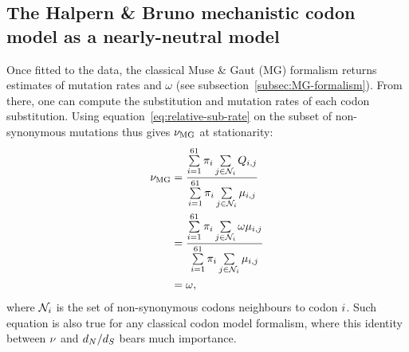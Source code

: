 \begin{table}[htbp]
    \centering
    \noindent{}
    \caption[Parameters of classical and mechanistic codon models]{Relationship between classical and mechanistic codon models}
    \label{table:params-codon-models}
\end{table}

\subsection{The Halpern \& Bruno mechanistic codon model as a nearly-neutral model}
\label{subsec:HB-formalism-nearly-neutral-model}

Once fitted to the data, the classical Muse \& Gaut (\acrshort{MG}) formalism returns estimates of mutation rates and $\omega$ (see subsection~\ref{subsec:MG-formalism}).
From there, one can compute the substitution and mutation rates of each codon substitution.
Using equation~\ref{eq:relative-sub-rate} on the subset of non-synonymous mutations thus gives $\nu_{\text{MG}}$ at stationarity:
\begin{align}
    \nu_{\text{MG}} & = \dfrac{ \sum\limits_{{i}=1}^{61} \pi_{{i}} \sum\limits_{{j} \in \mathcal{N}_{{i}}} Q_{{i}, {j}}}{\sum\limits_{{i}=1}^{61} \pi_{{i}} \sum\limits_{{j} \in \mathcal{N}_{{i}}} \mu_{{i}, {j}}} \\
    & = \dfrac{ \sum\limits_{{i}=1}^{61} \pi_{{i}} \sum\limits_{{j} \in \mathcal{N}_{{i}}} \omega \mu_{{i}, {j}}}{\sum\limits_{{i}=1}^{61} \pi_{{i}} \sum\limits_{{j} \in \mathcal{N}_{{i}}} \mu_{{i}, {j}}} \\
    & = \omega,
\end{align}
where $\mathcal{N}_{{i}}$ is the set of non-synonymous codons neighbours to codon ${i}$.
Such equation is also true for any classical codon model formalism, where this identity between $\nu$ and $d_N / d_S$ bears much importance.

